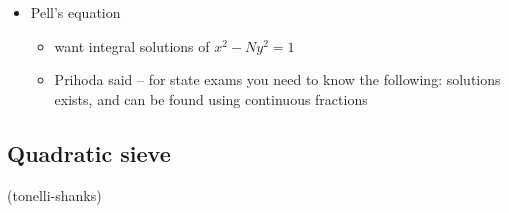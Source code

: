\begin{itemize}
	\item Pell's equation
	\begin{itemize}
		\item want integral solutions of $x^2-Ny^2 = 1$
		\item Prihoda said -- for state exams you need to know the following: solutions exists, and can be found using continuous fractions 
	\end{itemize}
\end{itemize}

\subsection*{Quadratic sieve} (tonelli-shanks)


